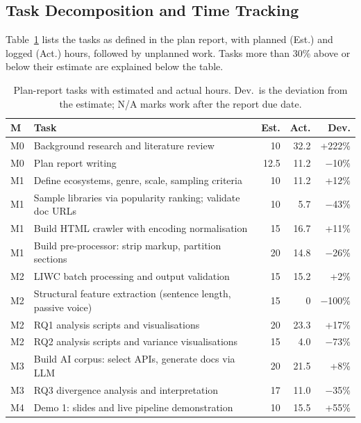 \documentclass[conference]{IEEEtran}
\begin{document}
\subsection{Task Decomposition and Time Tracking}

Table~\ref{tbl:tasks} lists the tasks as defined in the plan report, with
planned (Est.) and logged (Act.) hours, followed by unplanned work. Tasks more
than 30\% above or below their estimate are explained below the table.

\begin{table}[htbp]
\caption{Plan-report tasks with estimated and actual hours. Dev.\ is the
deviation from the estimate; N/A marks work after the report due date.}
\label{tbl:tasks}
\centering
\footnotesize
\begin{tabular}{@{}l p{} r r r@{}}
\toprule
\textbf{M} & \textbf{Task} & \textbf{Est.} & \textbf{Act.} & \textbf{Dev.} \\
\midrule
M0 & Background research and literature review          & 10   & 32.2 & +222\% \\
M0 & Plan report writing                                & 12.5 & 11.2 & $-$10\% \\
\midrule
M1 & Define ecosystems, genre, scale, sampling criteria & 10   & 11.2 & +12\% \\
M1 & Sample libraries via popularity ranking; validate doc URLs & 10 & 5.7 & $-$43\% \\
M1 & Build HTML crawler with encoding normalisation     & 15   & 16.7 & +11\% \\
M1 & Build pre-processor: strip markup, partition sections & 20 & 14.8 & $-$26\% \\
\midrule
M2 & LIWC batch processing and output validation        & 15   & 15.2 & +2\% \\
M2 & Structural feature extraction (sentence length, passive voice) & 15 & 0 & $-$100\% \\
M2 & RQ1 analysis scripts and visualisations            & 20   & 23.3 & +17\% \\
M2 & RQ2 analysis scripts and variance visualisations   & 15   & 4.0  & $-$73\% \\
\midrule
M3 & Build AI corpus: select APIs, generate docs via LLM & 20  & 21.5 & +8\% \\
M3 & RQ3 divergence analysis and interpretation         & 17   & 11.0 & $-$35\% \\
\midrule
M4 & Demo 1: slides and live pipeline demonstration     & 10   & 15.5 & +55\% \\

\end{tabular}
\end{table}
\end{document}
